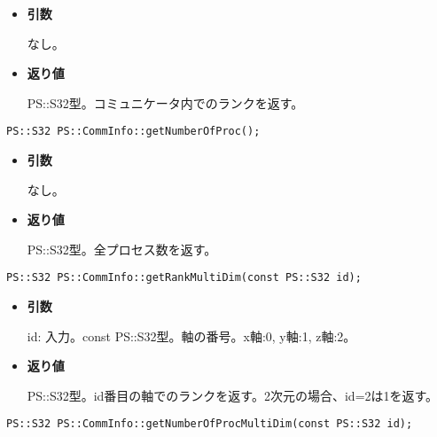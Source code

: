 \begin{itemize}

\item{{\bf 引数}}

なし。

\item{{\bf 返り値}}

{PS::S32}型。コミュニケータ内でのランクを返す。

\end{itemize}


\begin{screen}
\begin{verbatim}
PS::S32 PS::CommInfo::getNumberOfProc();
\end{verbatim}
\end{screen}

\begin{itemize}

\item{{\bf 引数}}

なし。

\item{{\bf 返り値}}

PS::S32型。全プロセス数を返す。

\end{itemize}


\begin{screen}
\begin{verbatim}
PS::S32 PS::CommInfo::getRankMultiDim(const PS::S32 id);
\end{verbatim}
\end{screen}

\begin{itemize}

\item{{\bf 引数}}

id: 入力。const PS::S32型。軸の番号。x軸:0, y軸:1, z軸:2。

\item{{\bf 返り値}}

PS::S32型。id番目の軸でのランクを返す。2次元の場合、id=2は1を返す。

\end{itemize}


\begin{screen}
\begin{verbatim}
PS::S32 PS::CommInfo::getNumberOfProcMultiDim(const PS::S32 id);
\end{verbatim}
\end{screen}

